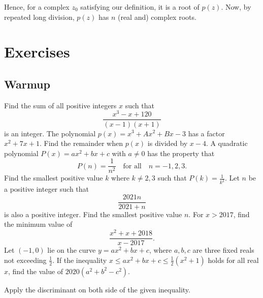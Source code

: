 \documentclass[../jarvis.tex]{subfiles}
\begin{document}
Hence, for a complex $z_0$ satisfying our definition, it is a root of $p(z)$. Now, by repeated long division, $p(z)$ has $n$ (real and) complex roots.

\section{Exercises}
\subsection{Warmup}
\problem[2012 SMO(S) P12]Find the sum of all positive integers $x$ such that $$\frac{x^3-x+120}{(x-1)(x+1)}$$ is an integer.
\problem[2018 SMO(S) P8]The polynomial $p(x)=x^3+Ax^2+Bx-3$ has a factor $x^2+7x+1$. Find the remainder when $p(x)$ is divided by $x-4$.
\problem[2021 SMO(S) P9]A quadratic polynomial $P(x)=ax^2+bx+c$ with $a\neq 0$ has the property that
$$P(n)=\frac{1}{n^2} \quad\text{for all}\quad n=-1,2,3.$$
Find the smallest positive value $k$ where $k\neq 2,3$ such that $P(k)=\frac{1}{k^2}$.
\problem[2021 SMO(S) P24]Let $n$ be a positive integer such that
$$\frac{2021n}{2021+n}$$ is also a positive integer. Find the smallest positive value $n$.
\problem[2018 SMO(O) P8]For $x>2017$, find the minimum value of $$\frac{x^2+x+2018}{x-2017}.$$
\problem[2019 SMO(O) P5]Let $(-1,0)$ lie on the curve $y=ax^2+bx+c$, where $a,b,c$ are three fixed reals not exceeding $\frac{1}{2}$. If the inequality $x\leq ax^2+bx+c\leq \frac{1}{2}(x^2+1)$ holds for all real $x$, find the value of $2020(a^2+b^2-c^2)$.
\begin{hints}
    \begin{hint}
        Apply the discriminant on both side of the given inequality.
    \end{hint}
\end{hints}
\end{document}

